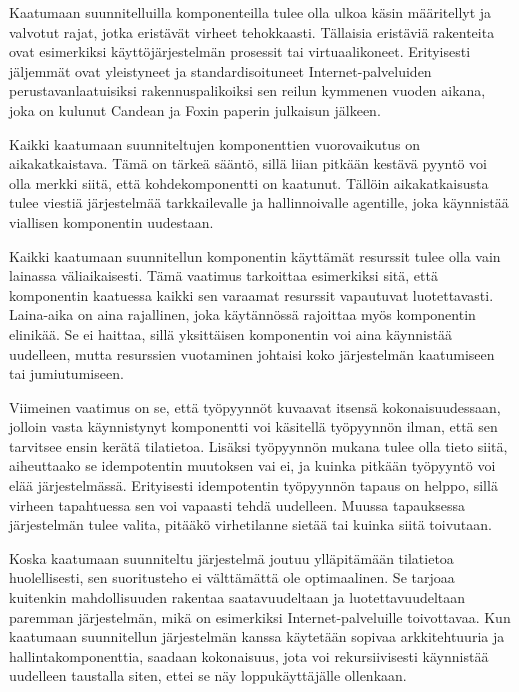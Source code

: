 \documentclass[a4paper,12pt]{article}
\begin{document}
Kaatumaan suunnitelluilla komponenteilla tulee olla ulkoa käsin mää\-ri\-tel\-lyt ja valvotut rajat, jotka eristävät virheet tehokkaasti. Tällaisia eristäviä rakenteita ovat esimerkiksi käyttöjärjestelmän prosessit tai virtuaalikoneet. Erityisesti jäljemmät ovat yleistyneet ja standardisoituneet Internet-pal\-ve\-lui\-den perustavanlaatuisiksi rakennuspalikoiksi sen reilun kymmenen vuoden aikana, joka on kulunut Candean ja Foxin paperin julkaisun jälkeen.

Kaikki kaatumaan suunniteltujen komponenttien vuorovaikutus on ai\-ka\-kat\-kais\-ta\-va. Tämä on tärkeä sääntö, sillä liian pitkään kestävä pyyntö voi olla merkki siitä, että kohdekomponentti on kaatunut. Tällöin aikakatkaisusta tulee viestiä järjestelmää tarkkailevalle ja hallinnoivalle agentille, joka käynnistää viallisen komponentin uudestaan.

Kaikki kaatumaan suunnitellun komponentin käyttämät resurssit tulee olla vain lainassa väliaikaisesti. Tämä vaatimus tarkoittaa esimerkiksi sitä, että komponentin kaatuessa kaikki sen varaamat resurssit vapautuvat luotettavasti. Laina-aika on aina rajallinen, joka käytännössä rajoittaa myös komponentin elinikää. Se ei haittaa, sillä yksittäisen komponentin voi aina käynnistää uudelleen, mutta resurssien vuotaminen johtaisi koko järjestelmän kaatumiseen tai jumiutumiseen.

Viimeinen vaatimus on se, että työpyynnöt kuvaavat itsensä kokonaisuudessaan, jolloin vasta käynnistynyt komponentti voi käsitellä työpyynnön ilman, että sen tarvitsee ensin kerätä tilatietoa. Lisäksi työpyynnön mukana tulee olla tieto siitä, aiheuttaako se idempotentin muutoksen vai ei, ja kuinka pitkään työpyyntö voi elää järjestelmässä. Erityisesti idempotentin työ\-pyyn\-nön tapaus on helppo, sillä virheen tapahtuessa sen voi vapaasti tehdä uudelleen. Muussa tapauksessa järjestelmän tulee valita, pitääkö virhetilanne sietää tai kuinka siitä toivutaan.

Koska kaatumaan suunniteltu järjestelmä joutuu ylläpitämään tilatietoa huolellisesti, sen suoritusteho ei välttämättä ole optimaalinen. Se tarjoaa kuitenkin mahdollisuuden rakentaa saatavuudeltaan ja luotettavuudeltaan paremman järjestelmän, mikä on esimerkiksi Internet-palveluille toivottavaa. Kun kaatumaan suunnitellun järjestelmän kanssa käytetään sopivaa arkkitehtuuria ja hallintakomponenttia, saadaan kokonaisuus, jota voi rekursiivisesti käynnistää uudelleen taustalla siten, ettei se näy loppukäyttäjälle ollenkaan.

\vspace{5.5em}
\end{document}

